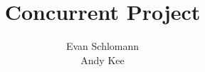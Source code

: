 \documentclass[12pt]{article}
\begin{document}
\doublespacing
\title{Concurrent Project}
\author{Evan Schlomann \\ Andy Kee}

\maketitle
\vfill

\pagebreak



\vspace{.5in}



\vspace{.5in}



\vspace{.5in}



\vspace{.5in}
\end{document}
